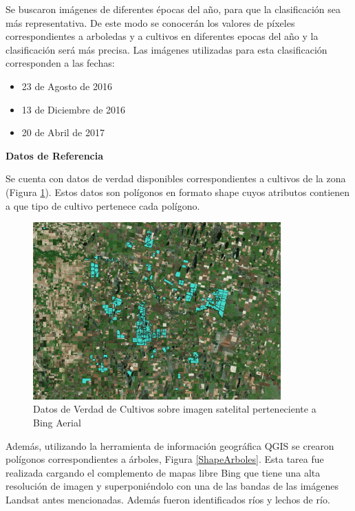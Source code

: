 \documentclass[10pt,a4paper, twoside]{report}
\begin{document}
Se buscaron imágenes de diferentes épocas del año, para que la clasificación sea más representativa. De este modo se conocerán los valores de píxeles correspondientes a arboledas y a cultivos en diferentes epocas del año y la clasificación será más precisa. Las imágenes utilizadas para esta clasificación corresponden a las fechas:

\begin{itemize}	
	\item 23 de Agosto de 2016
	\item 13 de Diciembre de 2016
	\item 20 de Abril de 2017
\end{itemize}

\textbf{Datos de Referencia}

Se cuenta con datos de verdad disponibles correspondientes a cultivos de la zona (Figura \ref{DatosDeVerdadCultivos}). Estos datos son polígonos en formato shape cuyos atributos contienen a que tipo de cultivo pertenece cada polígono.

\begin{figure}[!htb]
   \centering      
   \includegraphics[width=0.85\textwidth]{imagenes/DatosDeVerdadCultivos.jpg}
 \caption{Datos de Verdad de Cultivos sobre imagen satelital perteneciente a Bing Aerial}
 \label{DatosDeVerdadCultivos}
\end{figure}

Además, utilizando la herramienta de información geográfica QGIS se crearon polígonos correspondientes a árboles, Figura \ref{ShapeArboles}. Esta tarea fue realizada cargando el complemento de mapas libre Bing que tiene una alta resolución de imagen y superponiéndolo con una de las bandas de las imágenes Landsat antes mencionadas. Además fueron identificados ríos y lechos de río.
\end{document}
